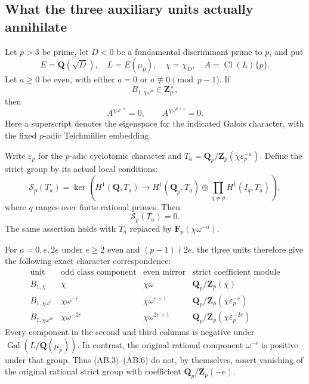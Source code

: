 \subsection{What the three auxiliary units actually annihilate}
\label{sec:kt-auxiliary-unit-bridge}

\begin{theorem}
Let $p>3$ be prime, let $D<0$ be a fundamental discriminant
prime to $p$, and put
\[
 E=\mathbf Q(\sqrt D),\quad L=E(\mu_p),\quad
 \chi=\chi_D,\quad A=\operatorname{Cl}(L)\{p\}.
                                                               \tag{AB.1}
\]
Let $a\ge0$ be even, with either $a=0$ or
$a\not\equiv0\pmod{p-1}$.  If
\[
                         B_{1,\chi\omega^a}\in\mathbf Z_p^\times,
                                                               \tag{AB.2}
\]
then
\[
             A^{\chi\omega^{-a}}=0,
             \qquad A^{\chi\omega^{a+1}}=0.               \tag{AB.3}
\]
Here a superscript denotes the eigenspace for the indicated
Galois character, with the fixed $p$-adic Teichm\"uller embedding.

Write $\varepsilon_p$ for the $p$-adic cyclotomic character and
$T_a=\mathbf Q_p/\mathbf Z_p(\chi\varepsilon_p^{-a})$.
Define the strict group by its actual local conditions:
\[
 \mathcal S_p(T_a)=\ker\left(H^1(\mathbf Q,T_a)\longrightarrow
 H^1(\mathbf Q_p,T_a)\oplus
       \prod_{q\ne p}H^1(I_q,T_a)\right),                 \tag{AB.4}
\]
where $q$ ranges over finite rational primes.  Then
\[
                            \mathcal S_p(T_a)=0.          \tag{AB.5}
\]
The same assertion holds with $T_a$ replaced by
$\mathbf F_p(\chi\omega^{-a})$.

For $a=0,e,2e$ under $e\ge2$ even and
$(p-1)\nmid2e$, the three units therefore give the following
exact character correspondence:
\[
\begin{array}{c|c|c|c}
\text{unit}&\text{odd class component}&\text{even mirror}
  &\text{strict coefficient module}\\ \hline
B_{1,\chi}&\chi&\chi\omega&\mathbf Q_p/\mathbf Z_p(\chi)\\
B_{1,\chi\omega^e}&\chi\omega^{-e}&\chi\omega^{e+1}
 &\mathbf Q_p/\mathbf Z_p(\chi\varepsilon_p^{-e})\\
B_{1,\chi\omega^{2e}}&\chi\omega^{-2e}&\chi\omega^{2e+1}
 &\mathbf Q_p/\mathbf Z_p(\chi\varepsilon_p^{-2e})
\end{array}                                                   \tag{AB.6}
\]
Every component in the second and third columns is negative
under $\operatorname{Gal}(L/\mathbf Q(\mu_p))$.
In contrast, the original rational component $\omega^{-e}$
is positive under that group.  Thus (AB.3)--(AB.6) do not,
by themselves, assert vanishing of the original rational
strict group with coefficient $\mathbf Q_p/\mathbf Z_p(-e)$.
\end{theorem}


